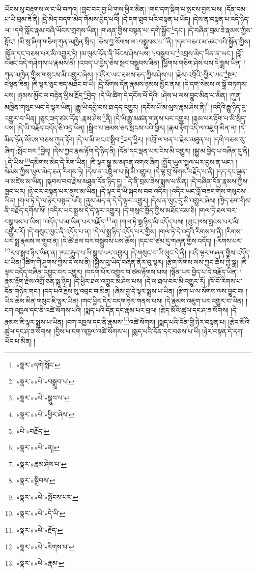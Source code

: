 ཡོངས་སུ་བརྟགས་ལ་ང་ཡི་བཀའ། །བླང་བར་བྱ་ཡི་གུས་ཕྱིར་མིན། །གང་དག་སྡིག་པ་སྤངས་བྱས་པས། །དོན་དམ་པ་ཡི་བྲམ་ཟེ་ནི། །དྲི་མེད་བདག་མེད་གོམས་བྱེད་པའི། །དེ་དག་ཐུབ་པའི་བསྟན་པ་ཡོད། །དེས་ན་བསྟན་པ་འདི་ཉིད་ལ། །དགེ་སློང་རྣམ་བཞི་ཡོངས་གྲགས་ཡིན། །གཞན་གྱིས་བསྟན་པ་:དགེ་སྦྱོང་\footnote{«སྣར་»དགེ་སློང་}དང་། །དེ་བཞིན་བྲམ་ཟེ་རྣམས་ཀྱིས་སྟོང་། །མི་སུ་ཞིག་གཅིག་ཀུན་མཁྱེན་སྲིད། །ཅེས་བྱ་སོགས་ལ་:བསྒྲུབས་པ་\footnote{«སྣར་»«པེ་»བསྒྲུབ་པ་}ནི། །དམ་བཅའ་མ་ཚང་བའི་སྐྱོན་གྱིས། །སྐྱོན་དང་བཅས་པར་མི་འགྱུར་ཏེ། །མ་ལུས་དོན་ནི་ཡོངས་ཤེས་པས། །:བསྒྲུབ་པ་\footnote{«སྣར་»«པེ་»སྒྲུབ་པ་}འབྲས་མེད་ཡིན་ན་ཡང་། །བློ་བཟང་བདེ་གཤེགས་པ་རྣམས་ནི། །འབད་པ་བྱེད་ཅེས་སྔར་བསྒྲུབས་ཟིན། །ཕྱོགས་གཅིག་ཤེས་པས་དེ་སྨྲས་ཡིན། །ཀུན་མཁྱེན་གྱིས་གསུངས་མི་འགྱུར་ཞེས། །འདིར་ཡང་ཐམས་ཅད་ཀྱིས་ཤེས་པ། །རྗེས་འགྲོའི་:ཕྱིར་ཡང་\footnote{«སྣར་»«པེ་»ཕྱིར་ཞེས་}སྔར་བསྟན་ཟིན། །ཇི་ལྟར་ཅུང་ཟད་མཐོང་བ་ཡི། །དྲི་སོགས་དོན་རྣམས་ཉམས་མྱོང་ནས། །དེ་དག་སེམས་ལ་སྒྲོ་བཏགས་པས། །ཉམས་མྱོང་ལ་བརྟེན་ཕྱིས་རྗོད་\footnote{«པེ་»བརྗོད་}བྱེད། །དེ་ཡི་ཚིག་དེ་དངོས་པོ་དེའི། །ཤེས་པ་ལས་བྱུང་མིན་པ་མིན། །ཀུན་མཁྱེན་གསུང་ཡང་དེ་ལྟར་ཡིན། །རྒྱུ་ཡི་དབྱེ་བས་ཐ་དད་འགྱུར། །དངོས་པོ་མ་ལུས་རྣམ་ཤེས་ནི།\footnote{«སྣར་»«པེ་»ན།} །འདིའི་རྒྱུ་ཉིད་དུ་འགྱུར་བ་ཡིན། །ཅུང་ཟད་ཙམ་དོན་:རྣམ་ཤེས་\footnote{«སྣར་»རྣམ་ཤེས་པ་}ནི། །དེ་ཡི་རྒྱུ་མཚན་གནས་པར་འགྱུར། །རྣམ་པར་རྟོག་པ་མི་སྲིད་པས། །དེ་ཡི་བརྗོད་འདོད་ཅི་འདྲ་ཡིན། །སྒྲིབ་པ་ཐམས་ཅད་སྤངས་པའི་ཕྱིར། །རྣམ་རྟོག་འདི་ལ་འཇུག་མིན་ན། །དེ་མིན་ཉོན་མོངས་བཅས་ཀུན་རྟོག །དེ་ལ་མི་མངའ་སྒྲིབ་\footnote{«སྣར་»སྒྲིབས་}ཟད་ཕྱིར། །འགྲོ་ལ་ཕན་པ་རྗེས་མཐུན་པ། །དགེ་བཅས་སུ་ཞིག་:སྤོང་བར་\footnote{«སྣར་»«པེ་»སྤོངས་པར་}བྱེད། །དེས་ཀྱང་རྣམ་རྟོག་དེ་ཉིད་ནི། །དོན་དང་ལྡན་པར་ངེས་མི་འགྱུར། །སྒྱུ་མ་བྱེད་པ་བཞིན་དུ་ནི། །:དེ་ཡིས་\footnote{«སྣར་»«པེ་»དེ་ཡི་}དམིགས་མེད་དེ་རིག་ཡིན། །ཇི་ལྟར་སྒྱུ་མ་མཁན་འགའ་ཞིག །སྤྱོད་ཡུལ་སྤྲུལ་པར་བྱས་ན་ཡང་། །སེམས་ཀྱིས་ཡུལ་མེད་ཅན་རིགས་ཏེ། །དེས་ན་འཁྲུལ་པ་སྐྱེ་མི་འགྱུར། །དེ་ལྟ་བུ་སོགས་བརྗོད་པ་ནི། །དད་དང་ལྡན་ལ་མཛེས་མ་ཡིན། །སྐབས་བབ་རྗེས་མཐུན་དོན་ཉིད་དུ། །
དེ་ནི་བྲམ་ཟེས་སྨྲས་པ་མིན། །དེ་བཞིན་དོན་རྣམས་ཀྱིས་ཁྱབ་པར། །ཉེ་བར་བསྟན་པར་ནུས་མ་ཡིན། །དེ་ལྟར་དེ་ཡི་སྐབས་བབ་འདིར། །འདིར་ཡང་བློ་བཟང་གིས་གསུངས་ཡིན། །གལ་ཏེ་དེ་ལ་ཉེར་བསྟན་པའི། །ནུས་མེད་ན་དེ་དེ་ལྟར་འགྱུར། །དེས་ན་ལུང་དུ་མི་འགྱུར་ཞེས། །ཁྱེད་ཅག་གིས་ནི་བརྗོད་དགོས་སོ། །འདིར་ཡང་སྨྲས་དེ་དེ་ལྟར་འགྱུར། །དེ་གསུང་ཁྱོད་ཀྱིས་མཐོང་ངམ་ཅི། །གལ་ཏེ་ཐལ་བར་བསྒྲུབས་པ་ཡིས། །འདོད་པ་མ་ཡིན་པར་བརྗོད་\footnote{«སྣར་»«པེ་»རྗོད་}ན། །གལ་ཏེ་སྒྲ་ཉིད་མི་འདོད་པས། །ལུང་ཁས་བླངས་པར་མི་འགྱུར་རོ། །དེ་གསུང་ལུང་ནི་འདོད་པ་ན། །དེ་ལ་སྨྲ་ཉིད་འདོད་པར་གྱིས། །གལ་ཏེ་དེ་འདྲའི་རིགས་པ་ནི། །རིགས་པར་སྨྲ་རྣམས་ལ་གྲུབ་ན། །དེ་ཚེ་ཐལ་བར་བསྒྲུབས་པས་ཆོས། །དང་བ་ཙམ་དུ་གཞན་གྱིས་འདོད། །:རིགས་པར་\footnote{«སྣར་»«པེ་»རིགས་པ་}རབ་སྒྲུབ་ཉིད་ཡིན་ན། །རང་རྒྱུད་པ་ཡི་སྒྲུབ་པར་འགྱུར། །དེ་གསུང་བ་ཡི་ལུང་དེ་ནི། །འདི་ལྟར་གཞན་གྱིས་འདོད་པ་ཡིན། །ཚིག་གི་ཤུགས་ཀྱིས་དེ་ལས་ནི། །སྐྱེས་བུ་ཡིད་བཞིན་ནོར་བུ་ལྟར། །རྩིག་སོགས་ལས་ཀྱང་ཆོས་ཀྱི་སྒྲ། །ཇི་ལྟར་འདོད་བཞིན་འབྱུང་བར་འགྱུར། །བདག་པོར་འགྱུར་བ་ཙམ་རྟོགས་པས། །སྟོན་པར་བྱེད་པ་དེ་བརྗོད་ཡིན། །རྣམ་རྟོག་རྗེས་འགྲོ་ཅན་སྨྲ་ཉིད། །དེ་ཕྱིར་ཐལ་འགྱུར་མ་ཤེས་པས། །དེ་ལ་ཐལ་བར་མི་འགྱུར་རོ། །ཁོ་བོ་རིགས་པ་དོན་གཉེར་གང་། །དད་པའི་རྗེས་སུ་འབྲང་བ་མིན། །ཞེས་བྱ་དེ་ལྟར་སྨྲས་པ་ཡིན། །རྩིག་པ་ལ་སོགས་ལས་བྱུང་བ། །ཡིད་ཆེས་མིན་གསུང་ཇི་ལྟར་ཡིན། །གང་ཕྱིར་དེར་བདག་ཉེར་གནས་པས། །དེ་རྣམས་འཇུག་པར་འགྱུར་བ་ཡིན། །ངག་འཁྱལ་དང་ནི་འཚེ་སོགས་པའི། །སྨད་པའི་དོན་དང་རྣམ་པར་བྲལ། །རྩེད་མོའི་ཚུལ་དང་ཤ་ཟ་སོགས། །དེ་རྣམས་ཇི་ལྟར་སྨྲས་པ་ཡིན། །ངག་འཁྱལ་དང་ནི་རྣམས་\footnote{«སྣར་»«པེ་»རྣམ་}འཚེ་སོགས། །སྨད་པའི་དོན་གྱི་ཉེར་བསྟན་པ། །རྩེད་མོའི་ཚུལ་དང་ཤ་ཟ་སོགས། །བྱིས་པ་ངག་འཁྱལ་འཚེ་སོགས་པ། །སྨད་པའི་དོན་དང་བཅས་པ་ཡི། །ཉེར་བསྟན་དེ་དག་ཡོད་པ་མིན། །
